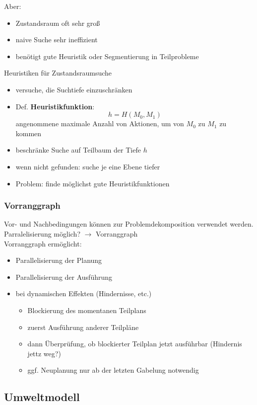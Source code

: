 Aber:
\begin{itemize}
\item Zustandsraum oft sehr groß
\item naive Suche sehr ineffizient
\item benötigt gute Heuristik oder Segmentierung in Teilprobleme
\end{itemize}
Heuristiken für Zustandsraumsuche
\begin{itemize}
\item versuche, die Suchtiefe einzuschränken
\item Def. \textbf{Heuristikfunktion}: $$h = H(M_0,M_1)$$ angenommene maximale Anzahl von Aktionen, um von $M_0$ zu $M_1$ zu kommen
\item beschränke Suche auf Teilbaum der Tiefe $h$
\item wenn nicht gefunden: suche je eine Ebene tiefer
\item Problem: finde möglichst gute Heuristikfunktionen
\end{itemize}
\subsubsection*{Vorranggraph}
Vor- und Nachbedingungen können zur Problemdekomposition verwendet werden. Parralelisierung möglich? $\to$ Vorranggraph \\
Vorranggraph ermöglicht:
\begin{itemize}
\item Parallelisierung der Planung
\item Parallelisierung der Ausführung
\item bei dynamischen Effekten (Hindernisse, etc.)
\begin{itemize}
\item Blockierung des momentanen Teilplans
\item zuerst Ausführung anderer Teilpläne
\item dann Überprüfung, ob blockierter Teilplan jetzt ausführbar (Hindernis jettz weg?)
\item ggf. Neuplanung nur ab der letzten Gabelung notwendig
\end{itemize}
\end{itemize}

\subsection{Umweltmodell}

